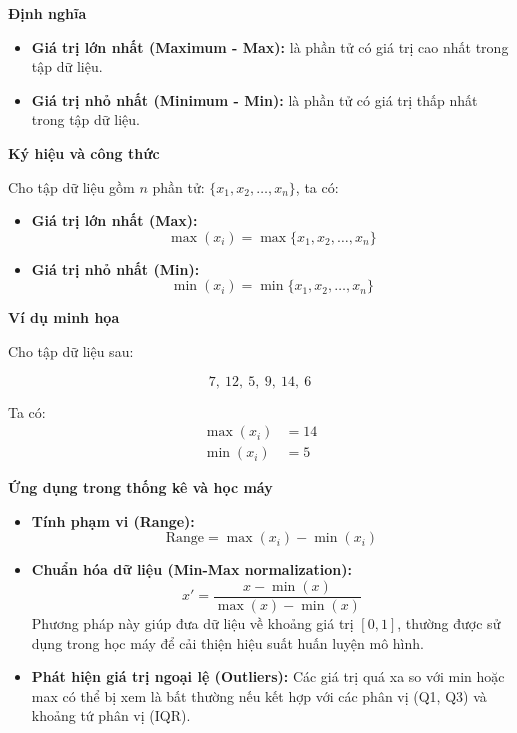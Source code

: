 \textbf{Định nghĩa}

\begin{itemize}
    \item \textbf{Giá trị lớn nhất (Maximum - Max):} là phần tử có giá trị cao nhất trong tập dữ liệu.
    \item \textbf{Giá trị nhỏ nhất (Minimum - Min):} là phần tử có giá trị thấp nhất trong tập dữ liệu.
\end{itemize}

\textbf{Ký hiệu và công thức}

Cho tập dữ liệu gồm \( n \) phần tử: \( \{x_1, x_2, \ldots, x_n\} \), ta có:

\begin{itemize}
    \item \textbf{Giá trị lớn nhất (Max):}
    \[
        \max(x_i) = \max \{ x_1, x_2, \ldots, x_n \}
    \]
    
    \item \textbf{Giá trị nhỏ nhất (Min):}
    \[
        \min(x_i) = \min \{ x_1, x_2, \ldots, x_n \}
    \]
\end{itemize}

\textbf{Ví dụ minh họa}

Cho tập dữ liệu sau:

\[
7,\ 12,\ 5,\ 9,\ 14,\ 6
\]

\noindent Ta có:
\begin{align*}
\max(x_i) &= 14 \\
\min(x_i) &= 5
\end{align*}

\textbf{Ứng dụng trong thống kê và học máy}

\begin{itemize}
    \item \textbf{Tính phạm vi (Range):}
    \[
        \text{Range} = \max(x_i) - \min(x_i)
    \]

    \item \textbf{Chuẩn hóa dữ liệu (Min-Max normalization):}
    \[
        x' = \frac{x - \min(x)}{\max(x) - \min(x)}
    \]
    Phương pháp này giúp đưa dữ liệu về khoảng giá trị \([0, 1]\), thường được sử dụng trong học máy để cải thiện hiệu suất huấn luyện mô hình.

    \item \textbf{Phát hiện giá trị ngoại lệ (Outliers):}  
    Các giá trị quá xa so với min hoặc max có thể bị xem là bất thường nếu kết hợp với các phân vị (Q1, Q3) và khoảng tứ phân vị (IQR).
\end{itemize}


